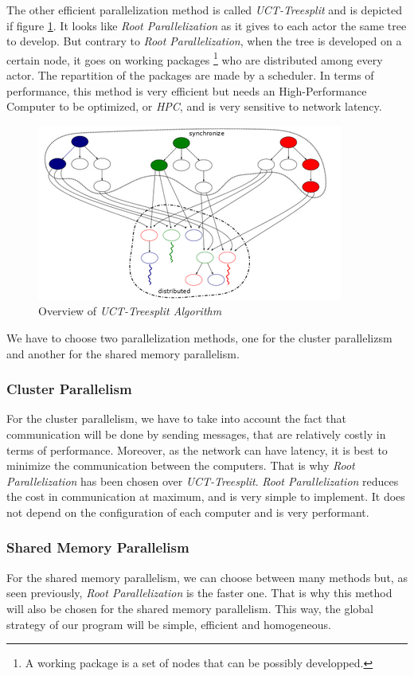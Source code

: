 The other efficient parallelization method is called \textit{UCT-Treesplit} and is depicted if figure \ref{fig:treesplit}. It looks like \textit{Root Parallelization} as it gives to each actor the same tree to develop.
But contrary to \textit{Root Parallelization}, when the tree is developed on a certain node, it goes on working packages \footnote{A working package is a set of nodes that can be possibly developped.} who are distributed among every actor. The repartition of the packages are made by a scheduler.
In terms of performance, this method is very efficient but needs an High-Performance Computer to be optimized, or \emph{HPC}, and is very sensitive to network latency.

\begin{figure}[!ht] 
\centerline{\includegraphics[scale=0.80]{3Methods/3.1Parallelization_Method/treesplit.png}}
   \caption{Overview of \textit{UCT-Treesplit Algorithm} \cite{treesplit}}
\label{fig:treesplit}
\end{figure}


We have to choose two parallelization methods, one for the cluster parallelizsm and another for the shared memory parallelism.
\subsubsection{Cluster Parallelism}
For the cluster parallelism, we have to take into account the fact that communication will be done by sending messages, that are relatively costly in terms of performance.
Moreover, as the network can have latency, it is best to minimize the communication between the computers. That is why \textit{Root Parallelization} has been chosen over \textit{UCT-Treesplit}.
\textit{Root Parallelization} reduces the cost in communication at maximum, and  is very simple to implement. It does not depend on the configuration of each computer and is very performant\cite{parallel_comp}.

\subsubsection{Shared Memory Parallelism}
For the shared memory parallelism, we can choose between many methods but, as seen previously, \textit{Root Parallelization} is the faster one\cite{parallel_comp}.
That is why this method will also be chosen for the shared memory parallelism. This way, the global strategy of our program will be simple, efficient and homogeneous.
